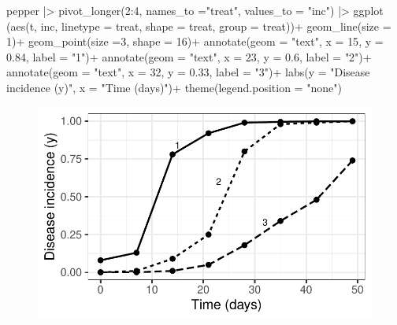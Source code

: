 \documentclass[
  letterpaper,
  DIV=11,
  numbers=noendperiod]{scrreprt}
\newenvironment{Shaded}{\begin{snugshade}}{\end{snugshade}}
\newcommand{\AttributeTok}[1]{\textcolor[rgb]{0.40,0.45,0.13}{#1}}
\newcommand{\DecValTok}[1]{\textcolor[rgb]{0.68,0.00,0.00}{#1}}
\newcommand{\FloatTok}[1]{\textcolor[rgb]{0.68,0.00,0.00}{#1}}
\newcommand{\FunctionTok}[1]{\textcolor[rgb]{0.28,0.35,0.67}{#1}}
\newcommand{\NormalTok}[1]{\textcolor[rgb]{0.00,0.23,0.31}{#1}}
\newcommand{\SpecialCharTok}[1]{\textcolor[rgb]{0.37,0.37,0.37}{#1}}
\newcommand{\StringTok}[1]{\textcolor[rgb]{0.13,0.47,0.30}{#1}}
\begin{document}
\begin{Shaded}
\begin{Highlighting}[]
\NormalTok{pepper }\SpecialCharTok{|\textgreater{}} 
  \FunctionTok{pivot\_longer}\NormalTok{(}\DecValTok{2}\SpecialCharTok{:}\DecValTok{4}\NormalTok{, }\AttributeTok{names\_to =}\StringTok{"treat"}\NormalTok{, }\AttributeTok{values\_to =} \StringTok{"inc"}\NormalTok{) }\SpecialCharTok{|\textgreater{}} 
  \FunctionTok{ggplot}\NormalTok{ (}\FunctionTok{aes}\NormalTok{(t, inc, }
              \AttributeTok{linetype =}\NormalTok{ treat, }
              \AttributeTok{shape =}\NormalTok{ treat, }
              \AttributeTok{group =}\NormalTok{ treat))}\SpecialCharTok{+}
  \FunctionTok{geom\_line}\NormalTok{(}\AttributeTok{size =} \DecValTok{1}\NormalTok{)}\SpecialCharTok{+}
  \FunctionTok{geom\_point}\NormalTok{(}\AttributeTok{size =}\DecValTok{3}\NormalTok{, }\AttributeTok{shape =} \DecValTok{16}\NormalTok{)}\SpecialCharTok{+}
  \FunctionTok{annotate}\NormalTok{(}\AttributeTok{geom =} \StringTok{"text"}\NormalTok{, }\AttributeTok{x =} \DecValTok{15}\NormalTok{, }\AttributeTok{y =} \FloatTok{0.84}\NormalTok{, }\AttributeTok{label =} \StringTok{"1"}\NormalTok{)}\SpecialCharTok{+}
  \FunctionTok{annotate}\NormalTok{(}\AttributeTok{geom =} \StringTok{"text"}\NormalTok{, }\AttributeTok{x =} \DecValTok{23}\NormalTok{, }\AttributeTok{y =} \FloatTok{0.6}\NormalTok{, }\AttributeTok{label =} \StringTok{"2"}\NormalTok{)}\SpecialCharTok{+}
  \FunctionTok{annotate}\NormalTok{(}\AttributeTok{geom =} \StringTok{"text"}\NormalTok{, }\AttributeTok{x =} \DecValTok{32}\NormalTok{, }\AttributeTok{y =} \FloatTok{0.33}\NormalTok{, }\AttributeTok{label =} \StringTok{"3"}\NormalTok{)}\SpecialCharTok{+}
  \FunctionTok{labs}\NormalTok{(}\AttributeTok{y =} \StringTok{"Disease incidence (y)"}\NormalTok{,}
       \AttributeTok{x =} \StringTok{"Time (days)"}\NormalTok{)}\SpecialCharTok{+}
  \FunctionTok{theme}\NormalTok{(}\AttributeTok{legend.position =} \StringTok{"none"}\NormalTok{)}
\end{Highlighting}
\end{Shaded}

\begin{figure}[H]

{\centering \includegraphics{./temporal-fitting_files/figure-pdf/unnamed-chunk-6-1.pdf}

}

\end{figure}
\end{document}
